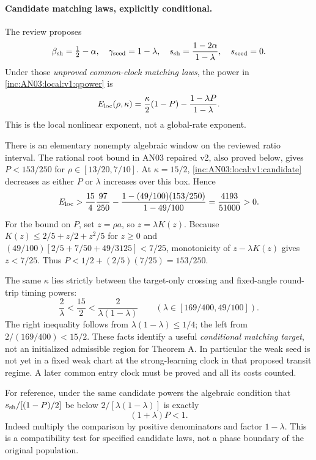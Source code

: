 \documentclass[11pt]{article}
\numberwithin{equation}{section}
\theoremstyle{remark}\newtheorem{remark}[theorem]{Remark}
\begin{document}
\paragraph{Candidate matching laws, explicitly conditional.}
The review proposes
\[
 \beta_{\rm sh}=\tfrac12-\alpha,\quad \gamma_{\rm seed}=1-\lambda,\quad
 s_{\rm sh}=\frac{1-2\alpha}{1-\lambda},\quad s_{\rm seed}=0.
\]
Under those \emph{unproved common-clock matching laws}, the power in
\eqref{inc:AN03:local:v1:qpower} is
\begin{equation}\label{inc:AN03:local:v1:candidate}
 E_{\rm loc}(\rho,\kappa)
 =\frac\kappa2(1-P)-\frac{1-\lambda P}{1-\lambda}.
\end{equation}
This is the local nonlinear exponent, not a global-rate exponent.

There is an elementary nonempty algebraic window on the reviewed ratio
interval. The rational root bound in AN03 repaired v2, also proved below,
gives $P<153/250$ for $\rho\in[13/20,7/10]$. At $\kappa=15/2$,
\eqref{inc:AN03:local:v1:candidate} decreases as either $P$ or $\lambda$
increases over this box. Hence
\begin{equation}\label{inc:AN03:local:v1:rationalwindow}
 E_{\rm loc}>
 \frac{15}{4}\frac{97}{250}
 -\frac{1-(49/100)(153/250)}{1-49/100}
 =\frac{4193}{51000}>0.
\end{equation}
For the bound on $P$, set $z=\rho a$, so $z=\lambda K(z)$.
Because $K(z)\le2/5+z/2+z^2/5$ for $z\ge0$ and
$(49/100)[2/5+7/50+49/3125]<7/25$, monotonicity of
$z-\lambda K(z)$ gives $z<7/25$. Thus
$P<1/2+(2/5)(7/25)=153/250$.

The same $\kappa$ lies strictly between the target-only crossing and
fixed-angle round-trip timing powers:
\[
 \frac2\lambda<\frac{15}{2}<\frac{2}{\lambda(1-\lambda)}
 \qquad(\lambda\in[169/400,49/100]).
\]
The right inequality follows from $\lambda(1-\lambda)\le1/4$;
the left from $2/(169/400)<15/2$. These facts identify a useful
\emph{conditional matching target}, not an initialized admissible
region for Theorem A. In particular the weak seed is not yet in a fixed
weak chart at the strong-learning clock in that proposed transit regime.
A later common entry clock must be proved and all its costs counted.

For reference, under the same candidate powers the algebraic condition
that $s_{\rm sh}/[(1-P)/2]$ be below $2/[\lambda(1-\lambda)]$ is exactly
\[
 (1+\lambda)P<1.
\]
Indeed multiply the comparison by positive denominators and factor
$1-\lambda$. This is a compatibility test for specified candidate laws,
not a phase boundary of the original population.
\end{document}
